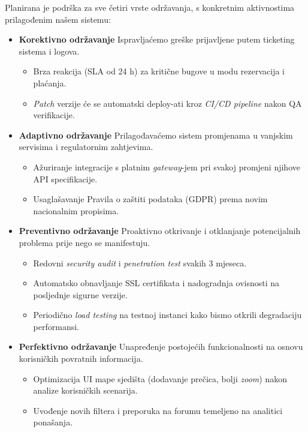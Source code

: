 Planirana je podrška za sve četiri vrste održavanja, s konkretnim aktivnostima prilagođenim našem sistemu:

\begin{itemize}
  \item \textbf{Korektivno održavanje}  
    Ispravljaćemo greške prijavljene putem ticketing sistema i logova.  
    \begin{itemize}
      \item Brza reakcija (SLA od 24 h) za kritične bugove u modu rezervacija i plaćanja.
      \item \emph{Patch} verzije će se automatski deploy-ati kroz \emph{CI/CD pipeline} nakon QA verifikacije.
    \end{itemize}

  \item \textbf{Adaptivno održavanje}  
    Prilagođavaćemo sistem promjenama u vanjskim servisima i regulatornim zahtjevima.  
    \begin{itemize}
      \item Ažuriranje integracije s platnim \emph{gateway}-jem pri svakoj promjeni njihove API specifikacije.
      \item Usaglašavanje Pravila o zaštiti podataka (GDPR) prema novim nacionalnim propisima.
    \end{itemize}

  \item \textbf{Preventivno održavanje}  
    Proaktivno otkrivanje i otklanjanje potencijalnih problema prije nego se manifestuju.  
    \begin{itemize}
      \item Redovni \emph{security audit} i \emph{penetration test} svakih 3 mjeseca.
      \item Automatsko obnavljanje SSL certifikata i nadogradnja ovisnosti na posljednje sigurne verzije.
      \item Periodično \emph{load testing }na testnoj instanci kako bismo otkrili degradaciju performansi.
    \end{itemize}

  \item \textbf{Perfektivno održavanje}  
    Unapređenje postojećih funkcionalnosti na osnovu korisničkih povratnih informacija.  
    \begin{itemize}
      \item Optimizacija UI mape sjedišta (dodavanje prečica, bolji \textit{ zoom}) nakon analize korisničkih scenarija.
      \item Uvođenje novih filtera i preporuka na forumu temeljeno na analitici ponašanja.
    \end{itemize}
\end{itemize}


